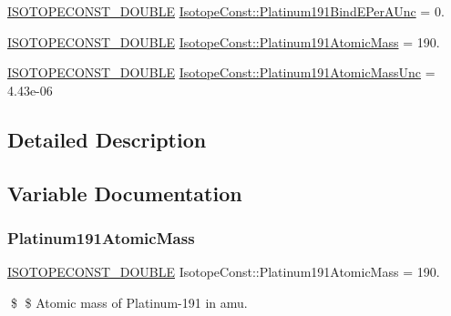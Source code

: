 \begin{DoxyCompactItemize}
\mbox{\hyperlink{group___isotope_const-_macros_ga8f45a7272ce02c0b4c65c44636ed719a}{I\+S\+O\+T\+O\+P\+E\+C\+O\+N\+S\+T\+\_\+\+D\+O\+U\+B\+LE}} \mbox{\hyperlink{group___isotope_const-_platinum-_pt191_gabe41697989ff982edc7a43b077d98aa3}{Isotope\+Const\+::\+Platinum191\+Bind\+E\+Per\+A\+Unc}} = 0.
\item 
\mbox{\hyperlink{group___isotope_const-_macros_ga8f45a7272ce02c0b4c65c44636ed719a}{I\+S\+O\+T\+O\+P\+E\+C\+O\+N\+S\+T\+\_\+\+D\+O\+U\+B\+LE}} \mbox{\hyperlink{group___isotope_const-_platinum-_pt191_ga360f957be8c6ab087b0cc7343566706a}{Isotope\+Const\+::\+Platinum191\+Atomic\+Mass}} = 190.
\item 
\mbox{\hyperlink{group___isotope_const-_macros_ga8f45a7272ce02c0b4c65c44636ed719a}{I\+S\+O\+T\+O\+P\+E\+C\+O\+N\+S\+T\+\_\+\+D\+O\+U\+B\+LE}} \mbox{\hyperlink{group___isotope_const-_platinum-_pt191_gae6b8cae244f8a96fb51054d592cc308c}{Isotope\+Const\+::\+Platinum191\+Atomic\+Mass\+Unc}} = 4.\+43e-\/06
\end{DoxyCompactItemize}


\subsection{Detailed Description}


\subsection{Variable Documentation}
\mbox{\label{group___isotope_const-_platinum-_pt191_ga360f957be8c6ab087b0cc7343566706a}} 
\subsubsection{\texorpdfstring{Platinum191\+Atomic\+Mass}{Platinum191AtomicMass}}
{\footnotesize\ttfamily \mbox{\hyperlink{group___isotope_const-_macros_ga8f45a7272ce02c0b4c65c44636ed719a}{I\+S\+O\+T\+O\+P\+E\+C\+O\+N\+S\+T\+\_\+\+D\+O\+U\+B\+LE}} Isotope\+Const\+::\+Platinum191\+Atomic\+Mass = 190.}

\$ \$ Atomic mass of Platinum-\/191 in amu. \mbox{\label{group___isotope_const-_platinum-_pt191_gae6b8cae244f8a96fb51054d592cc308c}} 
